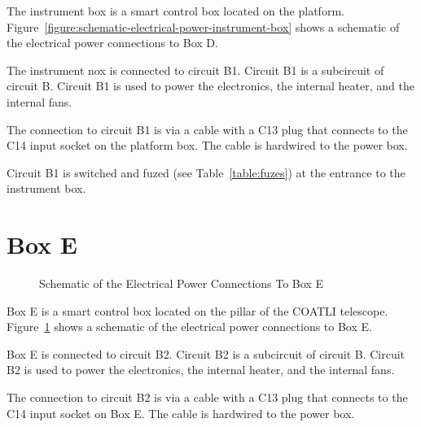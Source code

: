 The instrument box is a smart control box located on the platform. Figure~\ref{figure:schematic-electrical-power-instrument-box} shows a schematic of the electrical power connections to Box D.

The instrument nox is connected to circuit B1. Circuit B1 is a subcircuit of circuit B. Circuit B1 is used to power the electronics, the internal heater, and the internal fans.

The connection to circuit B1 is via a cable with a C13 plug that connects to the C14 input socket on the platform box. The cable is hardwired to the power box.

Circuit B1 is switched and fuzed (see Table~\ref{table:fuzes}) at the entrance to the instrument box.

\section{Box E}

\begin{figure}
\begin{center}
\footnotesize 
{}
\end{center}
\caption{Schematic of the Electrical Power Connections To Box E}
\label{figure:schematic-electrical-power-instrument1-box}
\end{figure}

Box E is a smart control box located on the pillar of the COATLI telescope. Figure~\ref{figure:schematic-electrical-power-instrument1-box} shows a schematic of the electrical power connections to Box E.

Box E is connected to circuit B2. Circuit B2 is a subcircuit of circuit B. Circuit B2 is used to power the electronics, the internal heater, and the internal fans.

The connection to circuit B2 is via a cable with a C13 plug that connects to the C14 input socket on Box E. The cable is hardwired to the power box.


